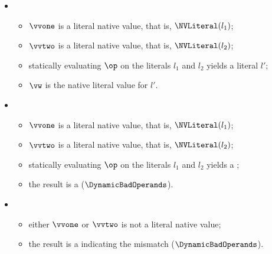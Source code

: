 \ProseParagraph
\OneApplies
\begin{itemize}
  \item {}
  \begin{itemize}
    \item $\vvone$ is a literal native value, that is, $\NVLiteral(l_1)$;
    \item $\vvtwo$ is a literal native value, that is, $\NVLiteral(l_2)$;
    \item statically evaluating $\op$ on the literals $l_1$ and $l_2$ yields a literal $l'$;
    \item $\vw$ is the native literal value for $l'$.
  \end{itemize}

  \item {}
  \begin{itemize}
    \item $\vvone$ is a literal native value, that is, $\NVLiteral(l_1)$;
    \item $\vvtwo$ is a literal native value, that is, $\NVLiteral(l_2)$;
    \item statically evaluating $\op$ on the literals $l_1$ and $l_2$ yields a \typingerrorterm{};
    \item the result is a \dynamicerrorterm{} ($\DynamicBadOperands$).
  \end{itemize}

  \item {}
  \begin{itemize}
    \item either $\vvone$ or $\vvtwo$ is not a literal native value;
    \item the result is a \dynamicerrorterm{} indicating the mismatch ($\DynamicBadOperands$).
  \end{itemize}
\end{itemize}

\FormallyParagraph
\begin{mathpar}
\end{mathpar}

\begin{mathpar}
\end{mathpar}

\begin{mathpar}
\end{mathpar}
